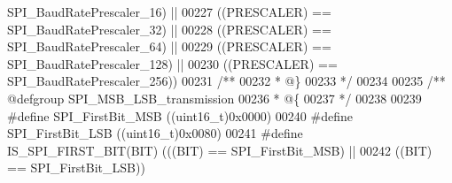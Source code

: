 \begin{DoxyCode}
      SPI_BaudRatePrescaler_16\textcolor{preprocessor}{)} \textcolor{preprocessor}{||}
00227                                               \textcolor{preprocessor}{(}\textcolor{preprocessor}{(}\textcolor{preprocessor}{PRESCALER}\textcolor{preprocessor}{)} \textcolor{preprocessor}{==} 
      SPI_BaudRatePrescaler_32\textcolor{preprocessor}{)} \textcolor{preprocessor}{||}
00228                                               \textcolor{preprocessor}{(}\textcolor{preprocessor}{(}\textcolor{preprocessor}{PRESCALER}\textcolor{preprocessor}{)} \textcolor{preprocessor}{==} 
      SPI_BaudRatePrescaler_64\textcolor{preprocessor}{)} \textcolor{preprocessor}{||}
00229                                               \textcolor{preprocessor}{(}\textcolor{preprocessor}{(}\textcolor{preprocessor}{PRESCALER}\textcolor{preprocessor}{)} \textcolor{preprocessor}{==} 
      SPI_BaudRatePrescaler_128\textcolor{preprocessor}{)} \textcolor{preprocessor}{||}
00230                                               \textcolor{preprocessor}{(}\textcolor{preprocessor}{(}\textcolor{preprocessor}{PRESCALER}\textcolor{preprocessor}{)} \textcolor{preprocessor}{==} 
      SPI_BaudRatePrescaler_256\textcolor{preprocessor}{)}\textcolor{preprocessor}{)}
00231 \textcolor{comment}{/**}
00232 \textcolor{comment}{  * @\}}
00233 \textcolor{comment}{  */}
00234 
00235 \textcolor{comment}{/** @defgroup SPI\_MSB\_LSB\_transmission }
00236 \textcolor{comment}{  * @\{}
00237 \textcolor{comment}{  */}
00238 
00239 \textcolor{preprocessor}{#}\textcolor{preprocessor}{define} \textcolor{preprocessor}{SPI\_FirstBit\_MSB}                \textcolor{preprocessor}{(}\textcolor{preprocessor}{(}\textcolor{preprocessor}{uint16\_t}\textcolor{preprocessor}{)}0x0000\textcolor{preprocessor}{)}
00240 \textcolor{preprocessor}{#}\textcolor{preprocessor}{define} \textcolor{preprocessor}{SPI\_FirstBit\_LSB}                \textcolor{preprocessor}{(}\textcolor{preprocessor}{(}\textcolor{preprocessor}{uint16\_t}\textcolor{preprocessor}{)}0x0080\textcolor{preprocessor}{)}
00241 \textcolor{preprocessor}{#}\textcolor{preprocessor}{define} \textcolor{preprocessor}{IS\_SPI\_FIRST\_BIT}\textcolor{preprocessor}{(}\textcolor{preprocessor}{BIT}\textcolor{preprocessor}{)} \textcolor{preprocessor}{(}\textcolor{preprocessor}{(}\textcolor{preprocessor}{(}\textcolor{preprocessor}{BIT}\textcolor{preprocessor}{)} \textcolor{preprocessor}{==} SPI_FirstBit_MSB\textcolor{preprocessor}{)} \textcolor{preprocessor}{||}
00242                                \textcolor{preprocessor}{(}\textcolor{preprocessor}{(}\textcolor{preprocessor}{BIT}\textcolor{preprocessor}{)} \textcolor{preprocessor}{==} SPI_FirstBit_LSB\textcolor{preprocessor}{)}\textcolor{preprocessor}{)}

\end{DoxyCode}
